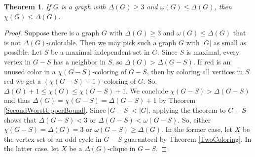 \documentclass[openany]{tufte-book} %
\theoremstyle{plain}
\newtheorem{theorem}{Theorem}
\newcommand{\card}[1]{\left|#1\right|}
\newcommand{\parens}[1]{\left( #1 \right)}
\begin{document}
\begin{theorem}
If $G$ is a graph with $\Delta(G) \ge 3$ and $\omega(G) \le \Delta(G)$, then $\chi(G) \le \Delta(G)$.
\label{BrooksTheorem}
\end{theorem}
\begin{proof}
Suppose there is a graph $G$  with $\Delta(G) \ge 3$ and $\omega(G) \le \Delta(G)$ that is not $\Delta(G)$-colorable.  
Then we may pick such a graph $G$ with $\card{G}$ as small as possible.  Let $S$ be 
a maximal independent set in $G$.  Since $S$ is maximal, every vertex in $G-S$ has a neighbor in $S$, so $\Delta(G) > \Delta(G-S)$.
If red is an unused color in a $\chi(G-S)$-coloring of $G-S$, then by coloring all vertices in $S$ red we get a $\parens{\chi(G-S)+1}$-coloring of $G$.  
So, $\Delta(G) + 1 \le \chi(G) \le \chi(G-S) + 1$. We conclude $\chi(G-S) > \Delta(G - S)$ and thus $\Delta(G) = \chi(G-S) = \Delta(G-S) + 1$ by Theorem \ref{SecondWorstUpperBound}.
Since $\card{G-S} < \card{G}$, applying the theorem to $G-S$ shows that $\Delta(G-S) < 3$ or $\Delta(G -S) < \omega(G - S)$.  
So, either $\chi(G-S) = \Delta(G) = 3$ or $\omega(G-S) \ge \Delta(G)$.  In the former case, let $X$ be the vertex set of an odd cycle in $G-S$ guaranteed by Theorem \ref{TwoColoring}.  
In the latter case, let $X$ be a $\Delta(G)$-clique in $G-S$.


\end{proof}
\end{document}
